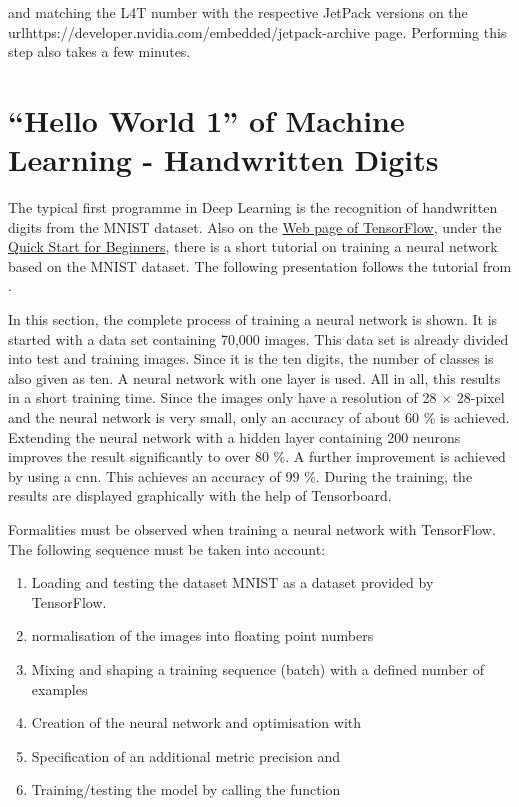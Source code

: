 \medskip


\medskip

and matching the L4T number with the respective JetPack versions on the url{https://developer.nvidia.com/embedded/jetpack-archive} page.
Performing this step also takes a few minutes.



\section{``Hello World 1'' of Machine Learning - Handwritten Digits}

The typical first programme in Deep Learning is the recognition of handwritten digits from the MNIST dataset. Also on the \href{https://www.tensorflow.org/}{Web page of TensorFlow}, under the \href{https://www.tensorflow.org/tutorials/quickstart/beginner}{Quick Start for Beginners}, there is a short tutorial on training a neural network based on the MNIST dataset. 
The following presentation follows the tutorial from \cite{Heise:2020}.

\bigskip

In this section, the complete process of training a neural network is shown. It is started with a data set containing 70,000 images. This data set is already divided into test and training images. Since it is the ten digits, the number of classes is also given as ten. A neural network with one layer is used. All in all, this results in a short training time. Since the images only have a resolution of 28 $\times$ 28-pixel and the neural network is very small, only an accuracy of about 60 \% is achieved. Extending the neural network with a hidden layer containing 200 neurons improves the result significantly to over 80 \%.  A further improvement is achieved by using a \ac{cnn}. This achieves an accuracy of 99 \%. During the training, the results are displayed graphically with the help of Tensorboard.

\bigskip

Formalities must be observed when training a neural network with TensorFlow. The following sequence must be taken into account:



\begin{enumerate}
  \item Loading and testing the dataset MNIST as a dataset provided by TensorFlow.
  \item normalisation of the images into floating point numbers
  \item Mixing and shaping a training sequence (batch) with a defined number of examples
  \item Creation of the neural network and optimisation with 
  \item Specification of an additional metric precision and 
  \item Training/testing the model by calling the function 
\end{enumerate}


